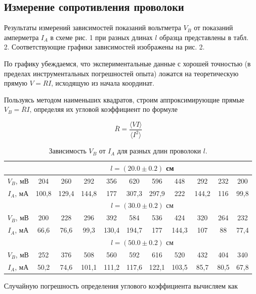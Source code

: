 \documentclass[a4paper, 12pt]{article}
\begin{document}
\subsection*{Измерение сопротивления проволоки}

Результаты измерений зависимостей показаний вольтметра $V_B$ от показаний амперметра $I_A$ в схеме рис. 1 при разных длинах $l$ образца представлены в табл. 2. Соответствующие графики зависимостей изображены на рис. 2. 

По графику убеждаемся, что экспериментальные данные с хорошей точностью (в пределах инструментальных погрешностей опыта) ложатся на теоретическую прямую $V=RI$, исходящую из начала координат.

Пользуясь методом наименьших квадратов, строим аппроксимирующие прямые $V_B = \overline{R}I$, определяя их угловой коэффициент по формуле

\[\overline{R}=\frac{\langle VI\rangle}{\langle I^2\rangle}\]

\begin{table}[!h]
\begin{center}
\begin{tabular}{|c|c|c|c|c|c|c|c|c|c|c|}
\hline
 & \multicolumn{10}{|c|}{$l=(20.0\pm 0.2)$ см} \\ \hline
$V_B$, мВ & 204 & 260 & 292 & 356 & 620 & 596 & 448 & 292 & 232 & 200 \\ \hline
$I_A$, мА & 100,8 & 129,4 & 144,8 & 177 & 307,3 & 297,9 & 222 & 144,2 & 116 & 99,8 \\ \hline
 & \multicolumn{10}{|c|}{$l=(30.0\pm 0.2)$ см} \\ \hline
$V_B$, мВ & 200 & 228 & 296 & 392 & 584 & 536 & 424 & 320 & 264 & 232 \\ \hline
$I_A$, мА & 66,6 & 76,6 & 99,3 & 130,4 & 194,7 & 177 & 144,3 & 107 & 88 & 77,4 \\ \hline
 & \multicolumn{10}{|c|}{$l=(50.0\pm 0.2)$ см} \\ \hline
$V_B$, мВ & 252 & 376 & 508 & 560 & 592 & 616 & 520 & 432 & 404 & 340 \\ \hline
$I_A$, мА & 50,2 & 74,6 & 101,1 & 111,2 & 117,6 & 122,1 & 103,5 & 85,7 & 80,5 & 67,8 \\ \hline
\end{tabular}
\caption{Зависимость $V_B$ от $I_A$ для разных длин проволоки $l$.}
\end{center}
\end{table}

Случайную погрешность определения углового коэффициента вычисляем как
\end{document}
